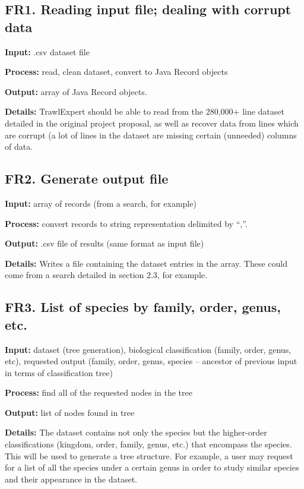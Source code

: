 \documentclass{article}
\begin{document}
\subsection{FR1. Reading input file; dealing with corrupt data}
\noindent \textbf{Input:} .csv dataset file

\noindent \textbf{Process:} read, clean dataset, convert to Java Record objects

\noindent \textbf{Output:} array of Java Record objects.

\noindent \textbf{Details:} TrawlExpert should be able to read from the 280,000+ line dataset detailed in the original project proposal, as well as recover data from lines which are corrupt (a lot of lines in the dataset are missing certain (unneeded) columns of data.

\subsection{FR2. Generate output file}
\noindent \textbf{Input:} array of records (from a search, for example)

\noindent \textbf{Process:} convert records to string representation delimited by ``,''.

\noindent \textbf{Output:} .csv file of results (same format as input file)

\noindent \textbf{Details:} Writes a file containing the dataset entries in the array. These could come from a search detailed in section 2.3, for example.

\subsection{FR3. List of species by family, order, genus, etc.}
\noindent \textbf{Input:} dataset (tree generation), biological classification (family, order, genus, etc), requested output (family, order, genus, species -- ancestor of previous input in terms of classification tree)

\noindent \textbf{Process:} find all of the requested nodes in the tree

\noindent \textbf{Output:} list of nodes found in tree

\noindent \textbf{Details:} The dataset contains not only the species but the higher-order classifications (kingdom, order, family, genus, etc.) that encompass the species. This will be used to generate a tree structure. For example, a user may request for a list of all the species under a certain genus in order to study similar species and their appearance in the dataset.
\end{document}
